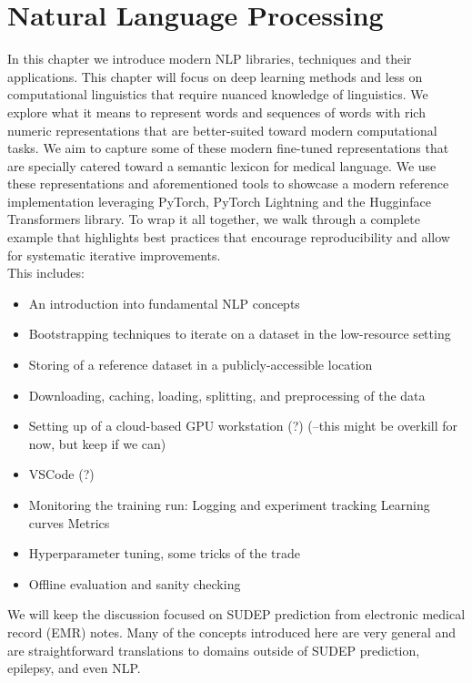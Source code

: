 \chapter{Natural Language Processing}
In this chapter we introduce modern NLP libraries, techniques and their applications.
This chapter will focus on deep learning methods and less on computational linguistics that require nuanced knowledge of linguistics.
We explore what it means to represent words and sequences of words with rich numeric representations that are better-suited toward modern computational tasks.
We aim to capture some of these modern fine-tuned representations that are specially catered toward a semantic lexicon for medical language.
We use these representations and aforementioned tools to showcase a modern reference implementation leveraging PyTorch, PyTorch Lightning and the Hugginface Transformers library.
To wrap it all together, we walk through a complete example that highlights best practices that encourage reproducibility and allow for systematic iterative improvements.
\\

\noindent This includes:
\begin{itemize}
\item An introduction into fundamental NLP concepts
\item Bootstrapping techniques to iterate on a dataset in the low-resource setting
\item Storing of a reference dataset in a publicly-accessible location
\item Downloading, caching, loading, splitting, and preprocessing of the data
\item Setting up of a cloud-based GPU workstation (?) (--this might be overkill for now, but keep if we can)
\item VSCode (?)
\item Monitoring the training run:
  \subitem Logging and experiment tracking
  \subitem Learning curves
  \subitem Metrics
\item Hyperparameter tuning, some tricks of the trade
\item Offline evaluation and sanity checking
\end{itemize}
We will keep the discussion focused on SUDEP prediction from electronic medical record (EMR) notes.
Many of the concepts introduced here are very general and are straightforward translations to domains outside of SUDEP prediction, epilepsy, and even NLP.

